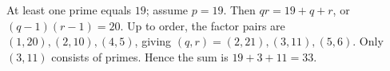 At least one prime equals $19$; assume $p=19$. Then $qr=19+q+r$, or $(q-1)(r-1)=20$. Up to order, the factor pairs are $(1,20),(2,10),(4,5)$, giving $(q,r)=(2,21),(3,11),(5,6)$. Only $(3,11)$ consists of primes. Hence the sum is $19+3+11=\boxed{33}$.

